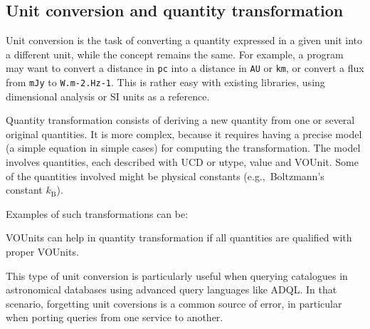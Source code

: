 \documentclass[11pt,a4paper]{ivoa}
\newcommand{\unit}[1]{\texttt{\small\color{orange}#1}}
\newcommand{\units}[1]{{\let~\thinspace
  \ifmmode
    \,\textrm{#1}%
  \else
    \nobreak$\,\mathrm{#1}$%
  \fi}}
\def\eg{e.g.,~}
\begin{document}
\subsection{Unit conversion and quantity transformation\label{sec:conversion}}

Unit conversion is the task of converting a quantity expressed
in a given unit into a different unit, while the concept remains the
same. For example, a program may want to convert a distance
in \unit{pc} into a distance in \unit{AU} or \unit{km}, or convert a
flux from \unit{mJy} to \unit{W.m-2.Hz-1}. This is rather easy with
existing libraries, using dimensional analysis or SI units as a
reference.

Quantity transformation consists of deriving a new quantity from one or several original
quantities. It is more complex, because it requires having a precise model
(a simple equation in simple cases) for computing the transformation. The model involves
quantities, each described with UCD or utype, value and VOUnit. Some of the quantities
involved might be physical constants (\eg  Boltzmann's constant $k_{\mathrm{B}}$).

Examples of such transformations can be:

VOUnits can help in quantity transformation if all quantities are qualified with proper VOUnits.

This type of unit conversion is particularly useful when querying
catalogues in astronomical databases using advanced query languages like
ADQL.  In that scenario, forgetting unit coversions is a common source
of error, in particular when porting queries from one service to
another.
\end{document}
